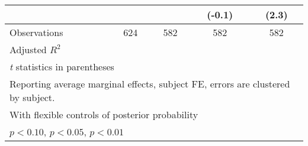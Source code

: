 \begin{table}[htbp]
\begin{tabular}{l*{4}{c}}
                &                  &                  &   (-0.1)         &    (2.3)         \\
\hline
Observations    &      624         &      582         &      582         &      582         \\
Adjusted \(R^{2}\)&                  &                  &                  &                  \\
\hline\hline
\multicolumn{5}{l}{\footnotesize \textit{t} statistics in parentheses}\\
\multicolumn{5}{l}{\footnotesize Reporting average marginal effects, subject FE, errors are clustered by subject.}\\
\multicolumn{5}{l}{\footnotesize With flexible controls of posterior probability}\\
\multicolumn{5}{l}{\footnotesize \sym{*} \(p<0.10\), \sym{**} \(p<0.05\), \sym{***} \(p<0.01\)}\\
\end{tabular}
\end{table}

